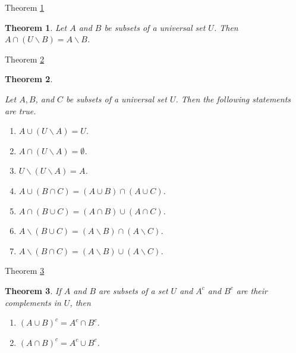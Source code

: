 \documentclass[avery5371,grid]{flashcards}
\newtheorem{theorem}{Theorem}
\begin{document}
\begin{flashcard}[Theorem]{Theorem \ref{thm05}}
\begin{theorem}
\label{thm05}
Let $A$ and $B$ be subsets of a universal set $U$.  Then
$A \cap (U \smallsetminus B) = A \smallsetminus B$.
\end{theorem}
\end{flashcard}

\begin{flashcard}[Theorem]{Theorem \ref{thm06}}
\begin{theorem}
\label{thm06}
\begin{small}
Let $A, B$, and $C$ be subsets of a universal set $U$.  Then the
following statements are true.
\begin{enumerate}
\item  $A \cup (U \smallsetminus A) = U$.
\item  $A \cap (U \smallsetminus A) = \emptyset $.
\item  $U \smallsetminus (U \smallsetminus A) = A$.
\item  $A \cup (B \cap C) = (A \cup B) \cap (A \cup C)$.
\item  $A \cap (B \cup C) = (A \cap B) \cup (A \cap C)$.
\item  $A \smallsetminus (B \cup C) = (A \smallsetminus B) \cap
(A \smallsetminus C)$.
\item  $A \smallsetminus (B \cap C) = (A \smallsetminus B) \cup
(A \smallsetminus C)$.
\end{enumerate}
\end{small}
\end{theorem}
\end{flashcard}

\begin{flashcard}[Theorem]{Theorem \ref{thm07}}
\begin{theorem}
\label{thm07}
If $A$ and $B$ are subsets of a set $U$ and $A^c$ and $B^c$ are their
complements in $U$, then
\begin{enumerate}
\item $(A \cup B)^c = A^c \cap B^c$.
\item $(A \cap B)^c = A^c \cup B^c$.
\end{enumerate}
\end{theorem}
\end{flashcard}
\end{document}
